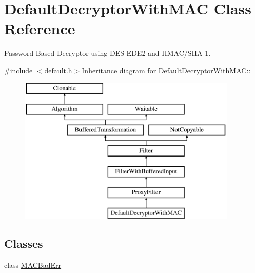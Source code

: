 \hypertarget{class_default_decryptor_with_m_a_c}{
\section{DefaultDecryptorWithMAC Class Reference}
\label{class_default_decryptor_with_m_a_c}
}


Password-\/Based Decryptor using DES-\/EDE2 and HMAC/SHA-\/1.  


{\ttfamily \#include $<$default.h$>$}Inheritance diagram for DefaultDecryptorWithMAC::\begin{figure}[H]
\begin{center}
\leavevmode
\includegraphics[height=7cm]{class_default_decryptor_with_m_a_c}
\end{center}
\end{figure}
\subsection*{Classes}
\begin{DoxyCompactItemize}
\item 
class \hyperlink{class_default_decryptor_with_m_a_c_1_1_m_a_c_bad_err}{MACBadErr}
\end{DoxyCompactItemize}
